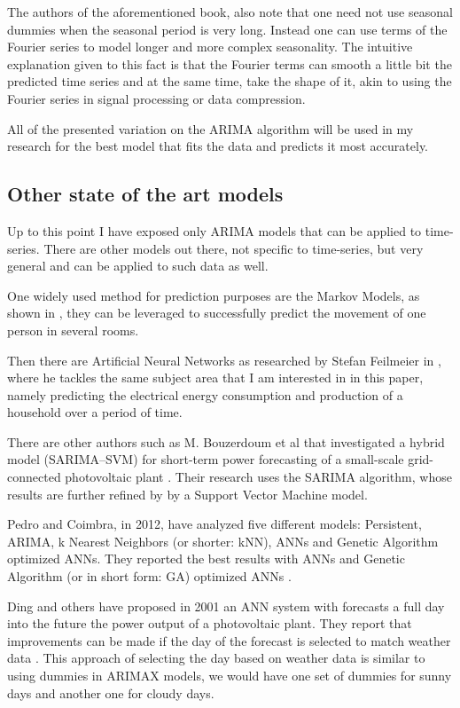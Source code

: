 \documentclass[12pt,a4paper,titlepage]{report}
\begin{document}
The authors of the aforementioned book, also note that one need not use seasonal dummies when the seasonal period is very long. Instead one can use terms of the Fourier series \cite{fpp2dhr} to model longer and more complex seasonality. The intuitive explanation given to this fact is that the Fourier terms can smooth a little bit the predicted time series and at the same time, take the shape of it, akin to using the Fourier series in signal processing or data compression.

All of the presented variation on the ARIMA algorithm will be used in my research for the best model that fits the data and predicts it most accurately.

\subsection{Other state of the art models}

Up to this point I have exposed only ARIMA models that can be applied to time-series. There are other models out there, not specific to time-series, but very general and can be applied to such data as well.

One widely used method for prediction purposes are the Markov Models, as shown in \cite{markovpersonmovement}, they can be leveraged to successfully predict the movement of one person in several rooms.

Then there are Artificial Neural Networks as researched by Stefan Feilmeier in \cite{feilmeier}, where he tackles the same subject area that I am interested in in this paper, namely predicting the electrical energy consumption and production of a household over a period of time.

There are other authors such as M. Bouzerdoum et al that investigated a hybrid model (SARIMA–SVM) for short-term power forecasting
of a small-scale grid-connected photovoltaic plant \cite{bouzerdoum}. Their research uses the SARIMA algorithm, whose results are further refined by by a Support Vector Machine model.

Pedro and Coimbra, in 2012, have analyzed five different models: Persistent, ARIMA, k Nearest Neighbors (or shorter: kNN), ANNs and Genetic Algorithm optimized ANNs. They reported the best results with ANNs and Genetic Algorithm (or in short form: GA) optimized ANNs \cite{pedrocoimbra}.

Ding and others have proposed in 2001 an ANN system with forecasts a full day into the future the power output of a photovoltaic plant. They report that improvements can be made if the day of the forecast is selected to match weather data \cite{ding2011ann}. This approach of selecting the day based on weather data is similar to using dummies in ARIMAX models, we would have one set of dummies for sunny days and another one for cloudy days.
\end{document}
